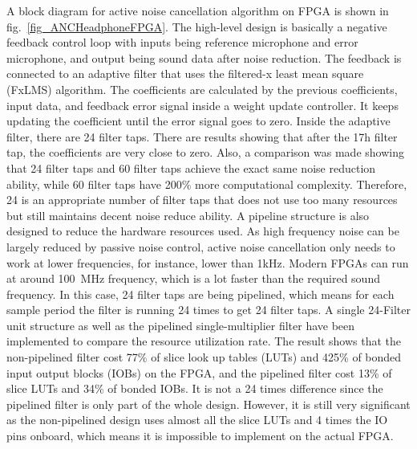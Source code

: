 A block diagram for active noise cancellation algorithm on FPGA \cite{ANC_Headphone_3} is shown in fig.~\ref{fig_ANCHeadphoneFPGA}.  The high-level design is basically a negative feedback control loop with inputs being reference microphone and error microphone, and output being sound data after noise reduction.  The feedback is connected to an adaptive filter that uses the filtered-x least mean square (FxLMS) algorithm.  The coefficients are calculated by the previous coefficients, input data, and feedback error signal inside a weight update controller.  It keeps updating the coefficient until the error signal goes to zero.  Inside the adaptive filter, there are 24 filter taps.  There are results showing that after the 17h filter tap, the coefficients are very close to zero.  Also, a comparison was made showing that 24 filter taps and 60 filter taps achieve the exact same noise reduction ability, while 60 filter taps have 200\% more computational complexity.  Therefore, 24 is an appropriate number of filter taps that does not use too many resources but still maintains decent noise reduce ability.  A pipeline structure is also designed to reduce the hardware resources used.  As high frequency noise can be largely reduced by passive noise control, active noise cancellation only needs to work at lower frequencies, for instance, lower than 1kHz.  Modern FPGAs can run at around \qty{100}{MHz} frequency, which is a lot faster than the required sound frequency.  In this case, 24 filter taps are being pipelined, which means for each sample period the filter is running 24 times to get 24 filter taps.  A single 24-Filter unit structure as well as the pipelined single-multiplier filter have been implemented to compare the resource utilization rate.  The result shows that the non-pipelined filter cost 77\% of slice look up tables (LUTs) and 425\% of bonded input output blocks (IOBs) on the FPGA, and the pipelined filter cost 13\% of slice LUTs and 34\% of bonded IOBs.  It is not a 24 times difference since the pipelined filter is only part of the whole design.  However, it is still very significant as the non-pipelined design uses almost all the slice LUTs and 4 times the IO pins onboard, which means it is impossible to implement on the actual FPGA.

